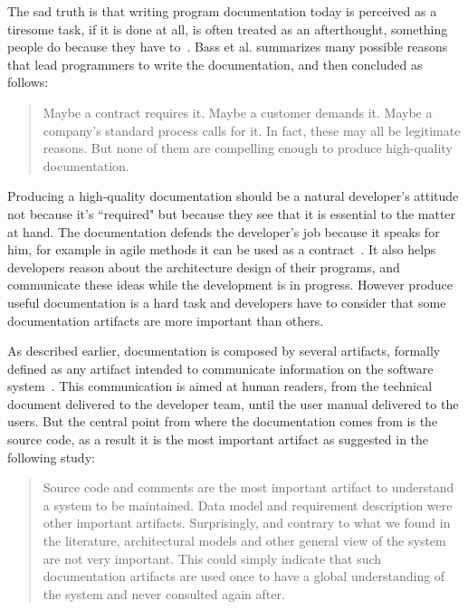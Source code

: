 The sad truth is that writing program documentation today is perceived as a tiresome task, if it is done at all, is often treated as an afterthought, something people do because they have to~\citep{sousa1998survey}. Bass et al. summarizes many possible reasons that lead programmers to write the documentation, and then concluded as follows:

\blockquote{Maybe a contract requires it. Maybe a customer demands it. Maybe a company's standard process calls for it. In fact, these may all be legitimate reasons. But none of them are compelling enough to produce high-quality documentation.~\citep[p. 327]{BassClementsKazman201210}}

Producing a high-quality documentation should be a natural developer's attitude not because it's ``required" but because they see that it is essential to the matter at hand. The documentation defends the developer's job because it speaks for him, for example in agile methods it can be used as a contract~\citep{ambler2007agile}. It also helps developers reason about the architecture design of their programs, and communicate these ideas while the development is in progress. However produce useful documentation is a hard task and developers have to consider that some documentation artifacts are more important than others.

As described earlier, documentation is composed by several artifacts, formally defined as any artifact intended to communicate information on the software system~\citep{forward2002relevance}. This communication is aimed at human readers, from the technical document delivered to the developer team, until the user manual delivered to the users. But the central point from where the documentation comes from is the source code, as a result it is the most important artifact as suggested in the following study:

\blockquote{Source code and comments are the most important artifact to understand a system to be maintained. Data model and requirement description were other important artifacts. Surprisingly, and contrary to what we found in the literature, architectural models and
other general view of the system are not very important. This could simply indicate that such documentation artifacts are used once to have a global understanding of the system and never consulted again after.~\citep[p. 74]{de2005study}}

